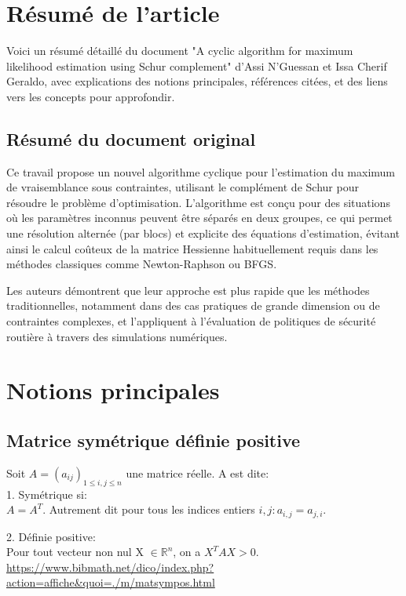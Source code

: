 \documentclass[12pt,a4paper]{article}
\begin{document}
	\section{Résumé de l’article} %
	Voici un résumé détaillé du document "A cyclic algorithm for maximum likelihood estimation using Schur complement" d’Assi N’Guessan et Issa Cherif Geraldo, avec explications des notions principales, références citées, et des liens vers les concepts pour approfondir.
	
	\subsection*{Résumé du document original} %
	Ce travail propose un nouvel algorithme cyclique pour l’estimation du maximum de vraisemblance sous contraintes, utilisant le complément de Schur pour résoudre le problème d’optimisation. L’algorithme est conçu pour des situations où les paramètres inconnus peuvent être séparés en deux groupes, ce qui permet une résolution alternée (par blocs) et explicite des équations d’estimation, évitant ainsi le calcul coûteux de la matrice Hessienne habituellement requis dans les méthodes classiques comme Newton-Raphson ou BFGS.
	
	Les auteurs démontrent que leur approche est plus rapide que les méthodes traditionnelles, notamment dans des cas pratiques de grande dimension ou de contraintes complexes, et l’appliquent à l’évaluation de politiques de sécurité routière à travers des simulations numériques.
	
	\section{Notions principales} %
	
	\subsection{Matrice symétrique définie positive}
	Soit $A=(a_{ij})_{1\leq i,j \leq n}$ une matrice réelle. A est dite:\\
	1.  Symétrique si: \\
	$A = A^T$. Autrement dit pour tous les indices entiers $i, j : a_{i,j} = a_{j,i}.$
	
	2. Définie positive:\\
	Pour tout vecteur non nul X $\in \mathbb{R}^n$, on a $X^TAX > 0.$\\ 
	\url{https://www.bibmath.net/dico/index.php?action=affiche&quoi=./m/matsympos.html}
	
\end{document}
